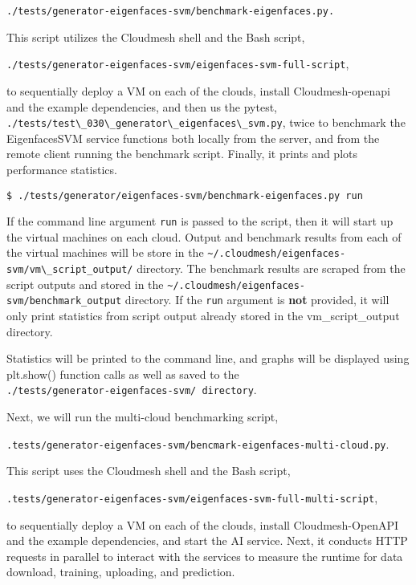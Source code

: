 \verb|./tests/generator-eigenfaces-svm/benchmark-eigenfaces.py.|

This script utilizes the Cloudmesh shell and the Bash script,

\verb|./tests/generator-eigenfaces-svm/eigenfaces-svm-full-script|,

to sequentially deploy a VM on each of the clouds, install
Cloudmesh-openapi and the example dependencies, and then us the
pytest, \\
\verb|./tests/test\_030\_generator\_eigenfaces\_svm.py|, twice to
benchmark the EigenfacesSVM service functions both locally from the
server, and from the remote client running the benchmark
script. Finally, it prints and plots performance statistics.

\begin{verbatim}
$ ./tests/generator/eigenfaces-svm/benchmark-eigenfaces.py run
\end{verbatim}

If the command line argument \verb|run| is passed to the script, then
it will start up the virtual machines on each cloud. Output and
benchmark results from each of the virtual machines will be store in the
\verb|~/.cloudmesh/eigenfaces-svm/vm\_script_output/| directory.
The benchmark results are scraped from the script outputs and stored in
the \verb|~/.cloudmesh/eigenfaces-svm/benchmark_output|
directory. If the \verb|run| argument is \textbf{not} provided, it
will only print statistics from script output already stored in the
vm\_script\_output directory.

Statistics will be printed to the command line, and graphs will be
displayed using plt.show() function calls as well as saved to the \\
\verb|./tests/generator-eigenfaces-svm/ directory|.

Next, we will run the multi-cloud benchmarking script,

\verb|.tests/generator-eigenfaces-svm/bencmark-eigenfaces-multi-cloud.py|.

This script uses the Cloudmesh shell and the Bash script,

\verb|.tests/generator-eigenfaces-svm/eigenfaces-svm-full-multi-script|,

to sequentially deploy a VM on each of the clouds, install
Cloudmesh-OpenAPI and the example dependencies, and start the AI
service. Next, it conducts HTTP requests in parallel to interact with
the services to measure the runtime for data download, training,
uploading, and prediction.


